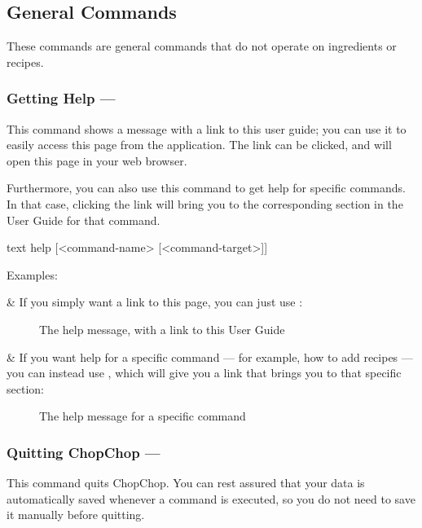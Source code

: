 
\pagebreak
\hypertarget{GroupGeneralCommands}{}
\subsection{General Commands}

These commands are general commands that do not operate on ingredients or recipes.

\hypertarget{HelpCommand}{}
\subsubsection{Getting Help — \texttt{}}

	This command shows a message with a link to this user guide; you can use it to easily access this page from the application.
	The link can be clicked, and will open this page in your web browser.

	Furthermore, you can also use this command to get help for specific commands. In that case, clicking the link will bring you
	to the corresponding section in the User Guide for that command.

	 \begin{blockofcode}{text}
		help [<command-name> [<command-target>]]
	\end{blockofcode}

	Examples:
	\begin{bulletlist}
	& If you simply want a link to this page, you can just use :
		\begin{figure}[!htbp]\centering\ContinuedFloat*
			\caption{The help message, with a link to this User Guide}
		\end{figure}

	& If you want help for a specific command --- for example, how to add recipes --- you can instead use ,
		which will give you a link that brings you to that specific section:
		\begin{figure}[!htbp]\centering\ContinuedFloat
			\caption{The help message for a specific command}
		\end{figure}

	\end{bulletlist}



\hypertarget{QuitCommand}{}
\subsubsection{Quitting ChopChop — \texttt{}}
	This command quits ChopChop. You can rest assured that your data is automatically saved whenever a command is executed, so you
	do not need to save it manually before quitting.

